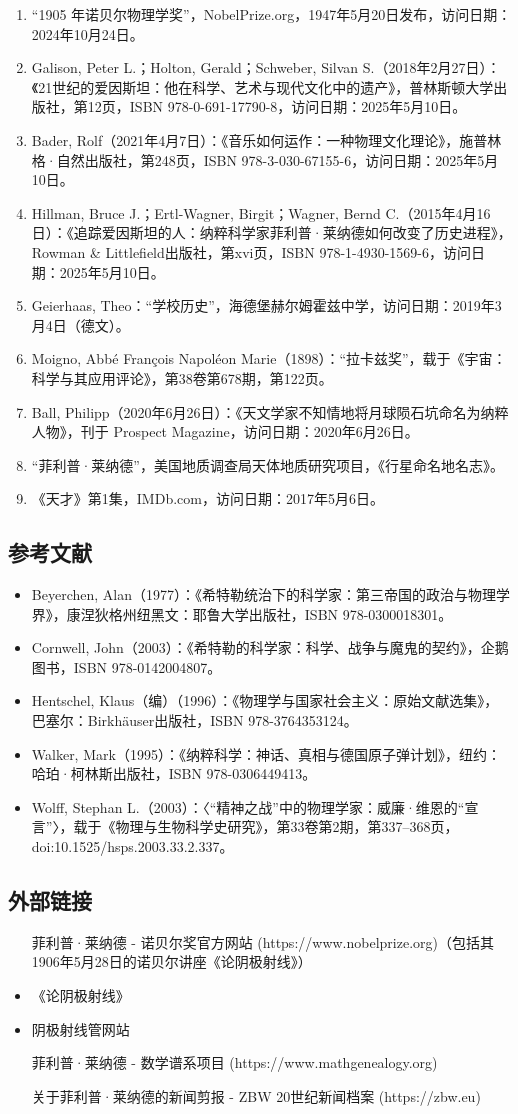 \begin{enumerate}
\item “1905 年诺贝尔物理学奖”，NobelPrize.org，1947年5月20日发布，访问日期：2024年10月24日。
\item Galison, Peter L.；Holton, Gerald；Schweber, Silvan S.（2018年2月27日）：《21世纪的爱因斯坦：他在科学、艺术与现代文化中的遗产》，普林斯顿大学出版社，第12页，ISBN 978-0-691-17790-8，访问日期：2025年5月10日。
\item Bader, Rolf（2021年4月7日）：《音乐如何运作：一种物理文化理论》，施普林格·自然出版社，第248页，ISBN 978-3-030-67155-6，访问日期：2025年5月10日。
\item Hillman, Bruce J.；Ertl-Wagner, Birgit；Wagner, Bernd C.（2015年4月16日）：《追踪爱因斯坦的人：纳粹科学家菲利普·莱纳德如何改变了历史进程》，Rowman & Littlefield出版社，第xvi页，ISBN 978-1-4930-1569-6，访问日期：2025年5月10日。
\item Geierhaas, Theo：“学校历史”，海德堡赫尔姆霍兹中学，访问日期：2019年3月4日（德文）。
\item Moigno, Abbé François Napoléon Marie（1898）：“拉卡兹奖”，载于《宇宙：科学与其应用评论》，第38卷第678期，第122页。
\item Ball, Philipp（2020年6月26日）：《天文学家不知情地将月球陨石坑命名为纳粹人物》，刊于 Prospect Magazine，访问日期：2020年6月26日。
\item “菲利普·莱纳德”，美国地质调查局天体地质研究项目，《行星命名地名志》。
\item 《天才》第1集，IMDb.com，访问日期：2017年5月6日。
\end{enumerate}
\subsection{参考文献}
\begin{itemize}
\item Beyerchen, Alan（1977）：《希特勒统治下的科学家：第三帝国的政治与物理学界》，康涅狄格州纽黑文：耶鲁大学出版社，ISBN 978-0300018301。
\item Cornwell, John（2003）：《希特勒的科学家：科学、战争与魔鬼的契约》，企鹅图书，ISBN 978-0142004807。
\item Hentschel, Klaus（编）（1996）：《物理学与国家社会主义：原始文献选集》，巴塞尔：Birkhäuser出版社，ISBN 978-3764353124。
\item Walker, Mark（1995）：《纳粹科学：神话、真相与德国原子弹计划》，纽约：哈珀·柯林斯出版社，ISBN 978-0306449413。
\item Wolff, Stephan L.（2003）：〈“精神之战”中的物理学家：威廉·维恩的“宣言”〉，载于《物理与生物科学史研究》，第33卷第2期，第337–368页，doi:10.1525/hsps.2003.33.2.337。
\end{itemize}
\subsection{外部链接}
\begin{itemize}
\item  [菲利普·莱纳德 - 诺贝尔奖官方网站](https://www.nobelprize.org)（包括其1906年5月28日的诺贝尔讲座《论阴极射线》）
\item  《论阴极射线》
\item  阴极射线管网站
\item  [菲利普·莱纳德 - 数学谱系项目](https://www.mathgenealogy.org)
\item  [关于菲利普·莱纳德的新闻剪报 - ZBW 20世纪新闻档案](https://zbw.eu)
\end{itemize}